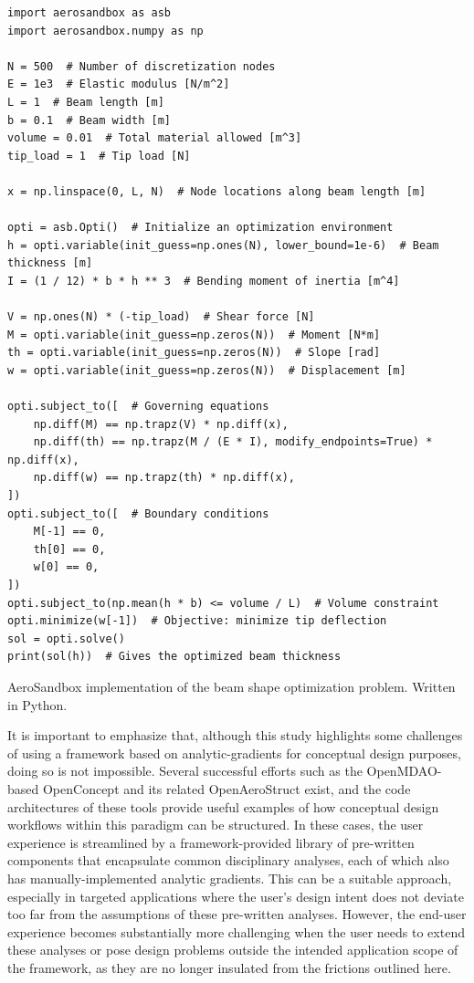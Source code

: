 \begin{listing}[h]
    \begin{verbatim}
import aerosandbox as asb
import aerosandbox.numpy as np

N = 500  # Number of discretization nodes
E = 1e3  # Elastic modulus [N/m^2]
L = 1  # Beam length [m]
b = 0.1  # Beam width [m]
volume = 0.01  # Total material allowed [m^3]
tip_load = 1  # Tip load [N]

x = np.linspace(0, L, N)  # Node locations along beam length [m]

opti = asb.Opti()  # Initialize an optimization environment
h = opti.variable(init_guess=np.ones(N), lower_bound=1e-6)  # Beam thickness [m]
I = (1 / 12) * b * h ** 3  # Bending moment of inertia [m^4]

V = np.ones(N) * (-tip_load)  # Shear force [N]
M = opti.variable(init_guess=np.zeros(N))  # Moment [N*m]
th = opti.variable(init_guess=np.zeros(N))  # Slope [rad]
w = opti.variable(init_guess=np.zeros(N))  # Displacement [m]

opti.subject_to([  # Governing equations
    np.diff(M) == np.trapz(V) * np.diff(x),
    np.diff(th) == np.trapz(M / (E * I), modify_endpoints=True) * np.diff(x),
    np.diff(w) == np.trapz(th) * np.diff(x),
])
opti.subject_to([  # Boundary conditions
    M[-1] == 0,
    th[0] == 0,
    w[0] == 0,
])
opti.subject_to(np.mean(h * b) <= volume / L)  # Volume constraint
opti.minimize(w[-1])  # Objective: minimize tip deflection
sol = opti.solve()
print(sol(h))  # Gives the optimized beam thickness
    \end{verbatim}
    \caption{AeroSandbox implementation of the beam shape optimization problem. Written in Python.}
    \label{lst:om_beam}
\end{listing}

It is important to emphasize that, although this study highlights some challenges of using a framework based on analytic-gradients for conceptual design purposes, doing so is not impossible. Several successful efforts such as the OpenMDAO-based OpenConcept \cite{Brelje2018a} and its related OpenAeroStruct \cite{Adler2022d} exist, and the code architectures of these tools provide useful examples of how conceptual design workflows within this paradigm can be structured. In these cases, the user experience is streamlined by a framework-provided library of pre-written components that encapsulate common disciplinary analyses, each of which also has manually-implemented analytic gradients. This can be a suitable approach, especially in targeted applications where the user's design intent does not deviate too far from the assumptions of these pre-written analyses. However, the end-user experience becomes substantially more challenging when the user needs to extend these analyses or pose design problems outside the intended application scope of the framework, as they are no longer insulated from the frictions outlined here.

